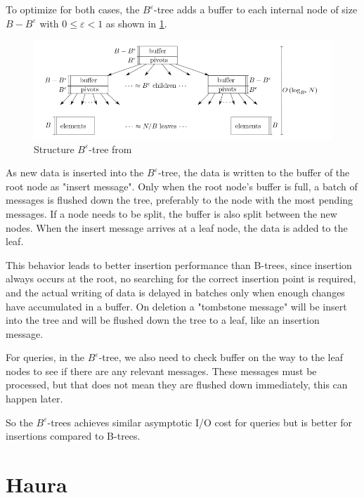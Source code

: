 \documentclass[
	12pt,
	a4paper,
	abstract,
	bibliography=totoc,
	chapterprefix,
	headings=openright,
	numbers=endperiod,
	parskip=half,
	twoside,
]{scrreprt}
\begin{document}
To optimize for both cases, the $B^{\varepsilon}$-tree adds a buffer to each internal node of size $B - B^{\varepsilon} $ with $ 0 \leq \varepsilon < 1$ as shown in \cref{fig:structure B-epsilon-tree}.

\begin{figure}[ht]
	\centering
	\includegraphics[scale=0.6]{B-epsilon_structure.png}
	\caption{Structure $B^{\varepsilon}$-tree from \cite{bender2015introduction}}
		\label{fig:structure B-epsilon-tree}
\end{figure}

As new data is inserted into the $B^{\varepsilon}$-tree, the data is written to the buffer of the root node as "insert message".
Only when the root node's buffer is full, a batch of messages is flushed down the tree, preferably to the node with the most pending messages. 
If a node needs to be split, the buffer is also split between the new nodes.
When the insert message arrives at a leaf node, the data is added to the leaf.

This behavior leads to better insertion performance than B-trees, since insertion always occurs at the root, no searching for the correct insertion point is required, and  
the actual writing of data is delayed in batches only when enough changes have accumulated in a buffer.
On deletion a "tombstone message" will be insert into the tree and will be flushed down the tree to a leaf, like an insertion message.

For queries, in the $B^{\varepsilon}$-tree, we also need to check buffer on the way to the leaf nodes to see if there are any relevant messages.
These messages must be processed, but that does not mean they are flushed down immediately, this can happen later.

So the $B^{\varepsilon}$-trees achieves similar asymptotic I/O cost for queries but is better for insertions compared to B-trees.


\section{Haura}
\label{sec:haura}
\end{document}
